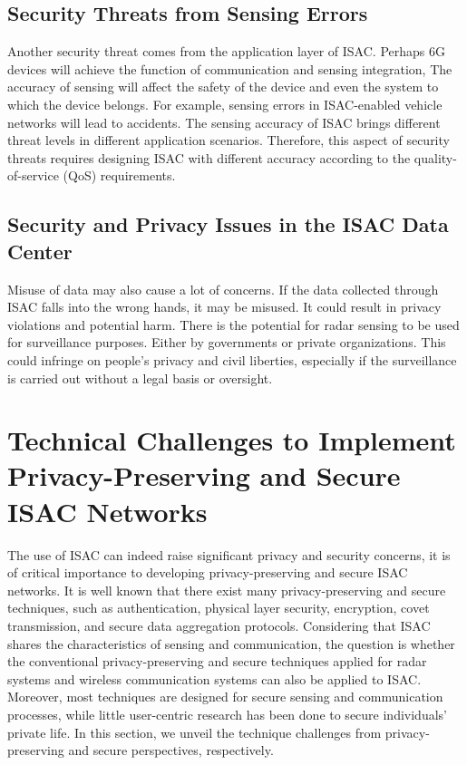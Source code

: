 \documentclass[10pt,journal,twocolumn,twoside]{IEEEtran} %
\begin{document}
\subsection{Security Threats from Sensing Errors}
Another security threat comes from the application layer of ISAC. Perhaps 6G devices will achieve the function of communication and sensing integration, The accuracy of sensing will affect the safety of the device and even the system to which the device belongs. For example, sensing errors in ISAC-enabled vehicle networks will lead to accidents.  The sensing accuracy of ISAC brings different threat levels in different application scenarios. Therefore, this aspect of security threats requires designing ISAC with different accuracy according to the quality-of-service (QoS) requirements.

\subsection{Security and Privacy Issues in the ISAC Data Center}


Misuse of data may also cause a lot of concerns.  If the data collected through ISAC falls into the wrong hands, it may be misused. It could result in privacy violations and potential harm. There is the potential for radar sensing to be used for surveillance purposes. Either by governments or private organizations. This could infringe on people's privacy and civil liberties, especially if the surveillance is carried out without a legal basis or oversight.

\section{Technical Challenges to Implement Privacy-Preserving and Secure ISAC Networks}
The use of ISAC can indeed raise significant privacy and security concerns, it is of critical importance to developing privacy-preserving and secure ISAC networks. It is well known that there exist many privacy-preserving and secure techniques, such as authentication, physical layer security, encryption, covet transmission, and secure data aggregation protocols. Considering that ISAC shares the characteristics of sensing and communication, the question is whether the conventional privacy-preserving and secure techniques applied for radar systems and wireless communication systems can also be applied to ISAC. Moreover, most techniques are designed for secure sensing and communication processes, while little user-centric research has been done to secure individuals' private life. In this section, we unveil the technique challenges from privacy-preserving and secure perspectives, respectively. 
\end{document}
